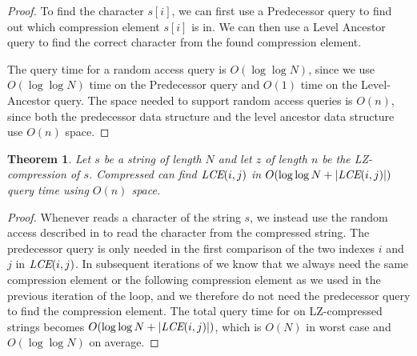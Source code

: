 \documentclass[a4]{article}
\newcommand*{\pref}{\prettyref}
\newtheorem{theorem}{Theorem}
\begin{document}
\begin{proof}
To find the character $s[i]$, we can first use a Predecessor query to find out which compression element $s[i]$ is in. We can then use a Level Ancestor query to find the correct character from the found compression element.



The query time for a random access query is $O(\log\log N)$, since we use $O(\log\log N)$ time on the Predecessor query and $O(1)$ time on the Level-Ancestor query. The space needed to support random access queries is $O(n)$, since both the predecessor data structure and the level ancestor data structure use $O(n)$ space.
\end{proof}

\begin{theorem}
Let $s$ be a string of length $N$ and let $z$ of length $n$ be the LZ-compression of $s$. Compressed  can find $\textit{LCE}(i,j)$ in $O(\log\log N + |\textit{LCE}(i,j)|)$ query time using $O(n)$ space.
\end{theorem}

\begin{proof}
Whenever  reads a character of the string $s$, we instead use the random access described in \pref{lem:lz-random-access} to read the character from the compressed string. The predecessor query is only needed in the first comparison of the two indexes $i$ and $j$ in $\textit{LCE}(i,j)$. In subsequent iterations of  we know that we always need the same compression element or the following compression element as we used in the previous iteration of the loop, and we therefore do not need the predecessor query to find the compression element. The total query time for  on LZ-compressed strings becomes $O(\log\log N + |\textit{LCE}(i,j)|)$, which is $O(N)$ in worst case and $O(\log \log N)$ on average.
\end{proof}
\end{document}
